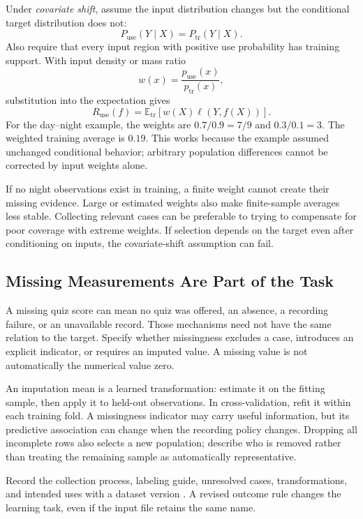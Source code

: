 Under \emph{covariate shift}, assume the input distribution changes but the conditional target distribution does not:
\[
P_{\mathrm{use}}(Y\mid X)=P_{\mathrm{tr}}(Y\mid X).
\]
Also require that every input region with positive use probability has training support. With input density or mass ratio
\[
w(x)=\frac{p_{\mathrm{use}}(x)}{p_{\mathrm{tr}}(x)},
\]
substitution into the expectation gives
\[
R_{\mathrm{use}}(f)
=\mathbb E_{\mathrm{tr}}[w(X)\ell(Y,f(X))].
\]
For the day--night example, the weights are $0.7/0.9=7/9$ and $0.3/0.1=3$. The weighted training average is $0.19$. This works because the example assumed unchanged conditional behavior; arbitrary population differences cannot be corrected by input weights alone.

If no night observations exist in training, a finite weight cannot create their missing evidence. Large or estimated weights also make finite-sample averages less stable. Collecting relevant cases can be preferable to trying to compensate for poor coverage with extreme weights. If selection depends on the target even after conditioning on inputs, the covariate-shift assumption can fail.

\subsection{Missing Measurements Are Part of the Task}

A missing quiz score can mean no quiz was offered, an absence, a recording failure, or an unavailable record. Those mechanisms need not have the same relation to the target. Specify whether missingness excludes a case, introduces an explicit indicator, or requires an imputed value. A missing value is not automatically the numerical value zero.

An imputation mean is a learned transformation: estimate it on the fitting sample, then apply it to held-out observations. In cross-validation, refit it within each training fold. A missingness indicator may carry useful information, but its predictive association can change when the recording policy changes. Dropping all incomplete rows also selects a new population; describe who is removed rather than treating the remaining sample as automatically representative.

Record the collection process, labeling guide, unresolved cases, transformations, and intended uses with a dataset version \citep{gebru2018datasheets}. A revised outcome rule changes the learning task, even if the input file retains the same name.

